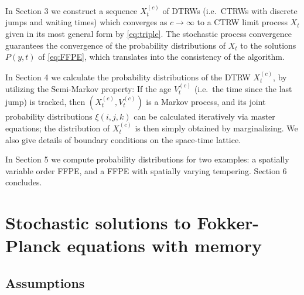 \documentclass[a4paper,12pt]{elsarticle}
\numberwithin{equation}{section}
\theoremstyle{plain}
\theoremstyle{definition}
\theoremstyle{remark}
\numberwithin{equation}{section}
\newcommand{\1}{\mathbf 1}
\begin{document}
In Section 3 we construct a sequence $X^{(c)}_t$ of DTRWs (i.e.\ CTRWs with discrete jumps and waiting times) which converges as
$c \to \infty$ to a CTRW limit process $X_t$ given in its most general form by \eqref{eq:triple}.  The stochastic process convergence guarantees the convergence of the probability distributions of $X_t$ to the solutions $P(y,t)$ of \eqref{eq:FFPE}, which translates into the consistency of the algorithm.

In Section 4 we calculate the probability distributions of the DTRW $X^{(c)}_t$, by utilizing the Semi-Markov property: If the age $V^{(c)}_t$ (i.e.\ the time since the last jump) is tracked, then
$(X^{(c)}_t, V^{(c)}_t)$ is a Markov process, and its joint probability distributions $\xi(i,j,k)$ can be calculated iteratively via master equations; the distribution of $X^{(c)}_t$ is then simply obtained by marginalizing. We also give details of boundary conditions on the space-time lattice.

In Section 5 we compute probability distributions for two examples: a spatially variable order FFPE, and a FFPE with spatially varying tempering. Section 6 concludes.





\section{Stochastic solutions to Fokker-Planck equations with memory}

\subsection{Assumptions}
\end{document}
